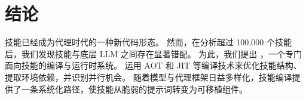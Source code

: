 \section{结论}
\label{sec:conclusion}

技能已经成为代理时代的一种新代码形态。
然而，在分析超过 100,000 个技能后，我们发现技能与底层 LLM 之间存在显著错配。
为此，我们提出 \sys，一个专门面向技能的编译与运行时系统。
\sys 运用 AOT 和 JIT 等编译技术来优化技能结构、提取环境依赖，并识别并行机会。
随着模型与代理框架日益多样化，技能编译提供了一条系统化路径，使技能从脆弱的提示词转变为可移植组件。
